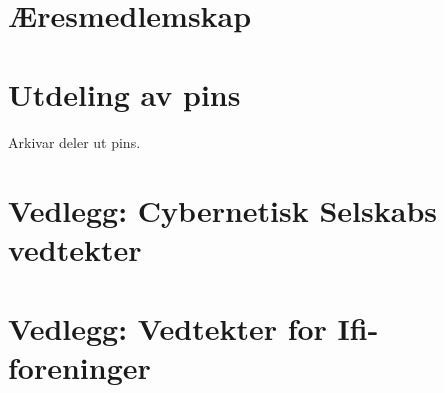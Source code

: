 \documentclass[10pt,norsk,a4paper]{article}
\begin{document}
\section{Æresmedlemskap}

\section{Utdeling av pins}
Arkivar deler ut pins.

\section*{Vedlegg: Cybernetisk Selskabs vedtekter}
\section*{Vedlegg: Vedtekter for Ifi-foreninger}\label{lastpage}


\newpage



\end{document}
